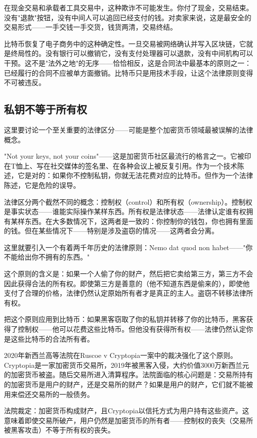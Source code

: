 \documentclass[a4paper,12pt,openany]{ctexbook}
\begin{document}
在现金交易和承载者工具交易中，这种欺诈不可能发生。你付了现金，交易结束。没有"退款"按钮，没有中间人可以追回已经支付的钱。对卖家来说，这是最安全的交易形式——一手交钱一手交货，钱货两清，交易终结。

比特币恢复了电子商务中的这种确定性。一旦交易被网络确认并写入区块链，它就是终局性的。没有银行可以撤销它，没有支付处理器可以退款，没有中间机构可以干预。这不是"法外之地"的无序——恰恰相反，这是合同法中最基本的原则之一：已经履行的合同不应被单方面撤销。比特币只是用技术手段，让这个法律原则变得不可被违反。


\subsection*{私钥不等于所有权}


这里要讨论一个至关重要的法律区分——可能是整个加密货币领域最被误解的法律概念。

"Not your keys, not your coins"——这是加密货币社区最流行的格言之一。它被印在T恤上、写在社交媒体的签名里、在各种会议上被反复引用。作为一个技术陈述，它是对的：如果你不控制私钥，你就无法花费对应的比特币。但作为一个法律陈述，它是危险的误导。

法律区分两个截然不同的概念：控制权（control）和所有权（ownership）。控制权是事实状态——谁能实际操作某样东西。所有权是法律状态——法律认定谁有权拥有某样东西。在大多数情况下，这两者是一致的：你控制你的钱包，你也拥有里面的钱。但在某些情况下——特别是涉及盗窃的情况——这两者会分离。

这里就要引入一个有着两千年历史的法律原则：Nemo dat quod non habet——"你不能给出你不拥有的东西。"

这个原则的含义是：如果一个人偷了你的财产，然后把它卖给第三方，第三方不会因此获得合法的所有权。即使第三方是善意的（他不知道东西是偷来的），即使他支付了合理的价格，法律仍然认定原始所有者才是真正的主人。盗窃不转移法律所有权。

把这个原则应用到比特币：如果黑客窃取了你的私钥并转移了你的比特币，黑客获得了控制权——他可以花费这些比特币。但他没有获得所有权——法律仍然认定你是这些比特币的合法所有者。

2020年新西兰高等法院在Ruscoe v Cryptopia一案中的裁决强化了这个原则。Cryptopia是一家加密货币交易所，2019年被黑客入侵，大约价值3000万新西兰元的加密货币被盗。随后交易所进入清算程序。法院面临的核心问题是：交易所持有的加密货币是用户的财产，还是交易所的财产？如果是用户的财产，它们就不能被用来偿还交易所的一般债务。

法院裁定：加密货币构成财产，且Cryptopia以信托方式为用户持有这些资产。这意味着即使交易所破产，用户仍然是加密货币的所有者——控制权的丧失（交易所被黑客攻击）不等于所有权的丧失。
\end{document}

